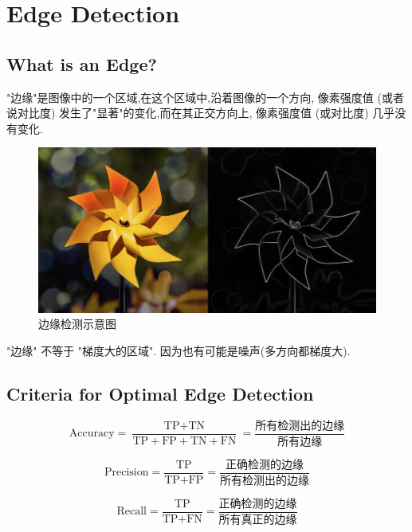 \chapter{Edge Detection}

\section{What is an Edge?}

"边缘"是图像中的一个区域,在这个区域中,沿着图像的一个方向,
像素强度值 (或者说对比度) 发生了"显著"的变化,而在其正交方向上,
像素强度值 (或对比度) 几乎没有变化.

\begin{figure}[htbp]
    \centering
	\includegraphics[scale=0.2]{figures/edge.png}
	\caption{边缘检测示意图}
\end{figure}

"边缘" 不等于 "梯度大的区域". 因为也有可能是噪声(多方向都梯度大).

\section{Criteria for Optimal Edge Detection}

\begin{equation}
\text{Accuracy}=\frac{\text{TP}+\text{TN}}{\text{TP}+\text{FP}+\text{TN}+\text{FN}} = \frac{\text{所有检测出的边缘}}{\text{所有边缘}}
\end{equation}

\begin{equation}
\text{Precision}=\frac{\text{TP}}{\text{TP}+\text{FP}} = \frac{\text{正确检测的边缘}}{\text{所有检测出的边缘}}
\end{equation}

\begin{equation}
\text{Recall}=\frac{\text{TP}}{\text{TP}+\text{FN}} = \frac{\text{正确检测的边缘}}{\text{所有真正的边缘}}
\end{equation}

